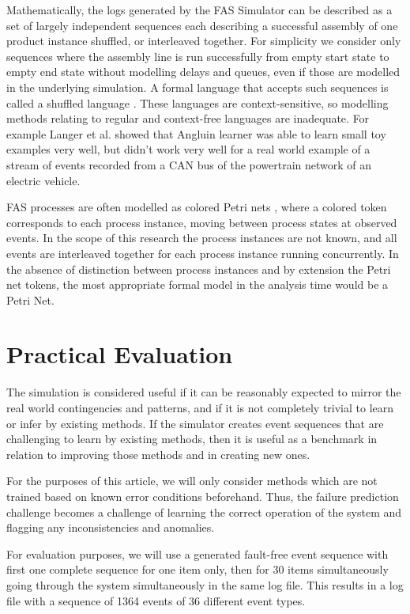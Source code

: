 \documentclass[procedia]{easychair}
\begin{document}
Mathematically, the logs generated by the FAS Simulator can be described as a set of largely independent sequences each describing a successful assembly of one product instance shuffled, or interleaved
together.
For simplicity we consider only sequences where the assembly line is run successfully from empty start state to empty end state without modelling delays and queues, even if those are modelled in the underlying
simulation.
A formal language that accepts such sequences is called a shuffled language \cite{berglund2011recognizing}. These languages are context-sensitive, so modelling methods
relating to regular and context-free languages are inadequate. For example Langer et al. \cite{langer2011self} showed that Angluin learner was able to learn small
toy examples very well, but didn't work very well for a real world example of a stream of events recorded from a CAN bus of the powertrain network of an electric vehicle.

FAS processes are often modelled as colored Petri nets \cite{saitou2002robust}, where a colored token corresponds to each process instance, moving between process states at observed events.
In the scope of this research the process instances are not known, and all events are interleaved together for each process instance running concurrently. In the absence of distinction between process instances
and by extension the Petri net tokens, the most appropriate formal model in the analysis time would be a Petri Net.

\section{Practical Evaluation}

The simulation is considered useful if it can be reasonably expected to mirror the real world contingencies and patterns, and if it is not completely trivial to
learn or infer by existing methods. If the simulator creates event sequences that are challenging to learn by existing methods, then it is useful as a benchmark
in relation to improving those methods and in creating new ones.

For the purposes of this article, we will only consider methods which are not trained based on known error conditions beforehand. Thus, the failure prediction challenge
becomes a challenge of learning the correct operation of the system and flagging any inconsistencies and anomalies.

For evaluation purposes, we will use a generated fault-free event sequence with first one complete sequence for one item only, then for 30 items simultaneously going through
the system simultaneously in the same log file. This results in a log file with a sequence of 1364 events of 36 different
event types.
\end{document}
